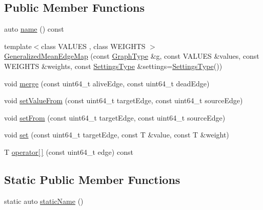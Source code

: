 \subsection*{Public Member Functions}
\begin{DoxyCompactItemize}
\item 
auto \hyperlink{classnifty_1_1graph_1_1agglo_1_1merge__rules_1_1GeneralizedMeanEdgeMap_af06f9a3635dd5727d241cd9e2b813bcc}{name} () const
\item 
{\footnotesize template$<$class V\+A\+L\+U\+ES , class W\+E\+I\+G\+H\+TS $>$ }\\\hyperlink{classnifty_1_1graph_1_1agglo_1_1merge__rules_1_1GeneralizedMeanEdgeMap_ac4afce4992201562e19a128e587fe6ae}{Generalized\+Mean\+Edge\+Map} (const \hyperlink{classnifty_1_1graph_1_1agglo_1_1merge__rules_1_1GeneralizedMeanEdgeMap_a8eb0e4528b41bb829281ea503ef0b1af}{Graph\+Type} \&g, const V\+A\+L\+U\+ES \&values, const W\+E\+I\+G\+H\+TS \&weights, const \hyperlink{classnifty_1_1graph_1_1agglo_1_1merge__rules_1_1GeneralizedMeanEdgeMap_afbff572fe3361a2a080a72b4e396e4ef}{Settings\+Type} \&settings=\hyperlink{classnifty_1_1graph_1_1agglo_1_1merge__rules_1_1GeneralizedMeanEdgeMap_afbff572fe3361a2a080a72b4e396e4ef}{Settings\+Type}())
\item 
void \hyperlink{classnifty_1_1graph_1_1agglo_1_1merge__rules_1_1GeneralizedMeanEdgeMap_a4df41391bbdf9f141a9a070800b10d6c}{merge} (const uint64\+\_\+t alive\+Edge, const uint64\+\_\+t dead\+Edge)
\item 
void \hyperlink{classnifty_1_1graph_1_1agglo_1_1merge__rules_1_1GeneralizedMeanEdgeMap_a2e0015fb4c10400a02d05f9711ba32c9}{set\+Value\+From} (const uint64\+\_\+t target\+Edge, const uint64\+\_\+t source\+Edge)
\item 
void \hyperlink{classnifty_1_1graph_1_1agglo_1_1merge__rules_1_1GeneralizedMeanEdgeMap_a5b2b026c5b458aa4c57a7d39ba38108e}{set\+From} (const uint64\+\_\+t target\+Edge, const uint64\+\_\+t source\+Edge)
\item 
void \hyperlink{classnifty_1_1graph_1_1agglo_1_1merge__rules_1_1GeneralizedMeanEdgeMap_ab407eba02e08981ed80bca00674e7edf}{set} (const uint64\+\_\+t target\+Edge, const T \&value, const T \&weight)
\item 
T \hyperlink{classnifty_1_1graph_1_1agglo_1_1merge__rules_1_1GeneralizedMeanEdgeMap_a4e22ae33e7f516f761bebd70724cce7f}{operator\mbox{[}$\,$\mbox{]}} (const uint64\+\_\+t edge) const
\end{DoxyCompactItemize}
\subsection*{Static Public Member Functions}
\begin{DoxyCompactItemize}
\item 
static auto \hyperlink{classnifty_1_1graph_1_1agglo_1_1merge__rules_1_1GeneralizedMeanEdgeMap_a1aa5fc876183432739c97f9b534456b1}{static\+Name} ()
\end{DoxyCompactItemize}



